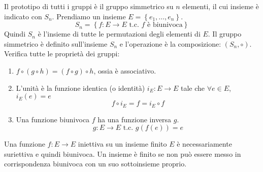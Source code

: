 \begin{defn}
Il prototipo di tutti i gruppi \`e il gruppo simmetrico su $n$ elementi, il cui insieme \`e indicato con $S_n$. Prendiamo un insieme $E = \left\{ e_1, \dots, e_n \right\}$.
\[
S_n = \left\{ f : E \to E \text{ t.c. $f$ \`e biunivoca} \right\}
\]
Quindi $S_n$ \`e l'insieme di tutte le permutazioni degli elementi di $E$. Il gruppo simmetrico \`e definito sull'insieme $S_n$ e l'operazione \`e la composizione: $\left( S_n, \circ \right)$. Verifica tutte le propriet\`a dei gruppi:
\begin{enumerate}
    \item $f \circ \left( g \circ h \right) = \left( f \circ g \right) \circ h$, ossia \`e associativo.
    \item L'unit\`a \`e la funzione identica (o identit\`a) $i_E : E \to E$ tale che $\forall e \in E $, $i_E(e) = e$
    \[
    f \circ i_E = f = i_E \circ f
    \]
    \item Una funzione biunivoca $f$ ha una funzione inversa $g$.
    \[
    g : E \to E \text{ t.c. } g \left( f(e) \right) = e
    \]
\end{enumerate}
\end{defn}

Una funzione $f : E \to E $ iniettiva su un insieme finito $E$ \`e necessariamente suriettiva e quindi biunivoca. Un insieme \`e finito se non pu\`o essere messo in corrispondenza biunivoca con un suo sottoinsieme proprio.







